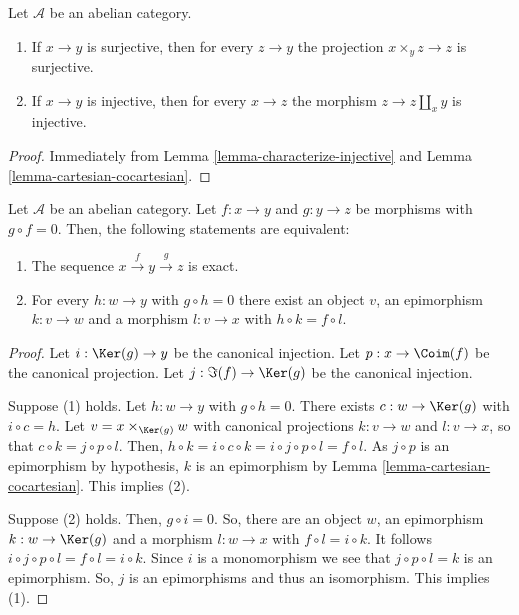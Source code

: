 \begin{lemma}
\label{lemma-epimorphism-universal-abelian-category}
Let $\mathcal{A}$ be an abelian category.
\begin{enumerate}
\item If $x \to y$ is surjective, then for every $z \to y$ the
projection $x \times_y z \to z$ is surjective.
\item If $x \to y$ is injective, then for every $x \to z$ the
morphism $z \to z \amalg_x y$ is injective.
\end{enumerate}
\end{lemma}

\begin{proof}
Immediately from Lemma \ref{lemma-characterize-injective} and
Lemma \ref{lemma-cartesian-cocartesian}.
\end{proof}

\begin{lemma}
\label{lemma-check-exactness-fibre-product}
Let $\mathcal{A}$ be an abelian category. Let $f:x\to y$ and $g:y\to z$ 
be morphisms with $g\circ f=0$. Then, the following statements are equivalent:
\begin{enumerate}
\item The sequence $x\overset{f}\to y\overset{g}\to z$ is exact.
\item For every $h:w\to y$ with $g\circ h=0$ there exist an object $v$, 
an epimorphism $k:v\to w$ and a morphism $l:v\to x$ with $h\circ k=f\circ l$.
\end{enumerate}
\end{lemma}

\begin{proof}
Let $i:\Ker(g)\to y$ be the canonical injection. Let 
$p:x\to\Coim(f)$ be the canonical projection. Let 
$j:\Im(f)\to\Ker(g)$ be the canonical injection.

\medskip\noindent
Suppose (1) holds. Let $h:w\to y$ with $g\circ h=0$. There exists 
$c:w\to\Ker(g)$ with $i\circ c=h$. 
Let $v=x\times_{\Ker(g)}w$ with canonical projections 
$k:v\to w$ and $l:v\to x$, so that $c\circ k=j\circ p\circ l$. 
Then, $h\circ k=i\circ c\circ k=i\circ j\circ p\circ l=f\circ l$. 
As $j\circ p$ is an epimorphism by hypothesis, $k$ is an 
epimorphism by Lemma \ref{lemma-cartesian-cocartesian}. This implies (2).

\medskip\noindent
Suppose (2) holds. Then, $g\circ i=0$. So, there are an object 
$w$, an epimorphism $k:w\to\Ker(g)$ and a morphism 
$l:w\to x$ with $f\circ l=i\circ k$. It follows 
$i\circ j\circ p\circ l=f\circ l=i\circ k$. Since $i$ is a 
monomorphism we see that $j\circ p\circ l=k$ is an epimorphism. 
So, $j$ is an epimorphisms and thus an isomorphism. This implies (1).
\end{proof}

